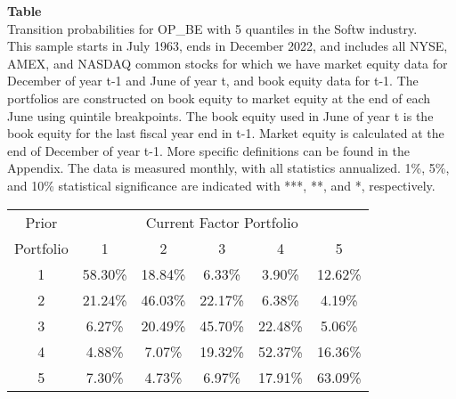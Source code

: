 \begin{table*}[ht!]
\raggedright
{}
\label{tab: transition_probs_OP_BE_Softw_with_5_quantiles}
\textbf{Table \thetable} \\
Transition probabilities for OP_BE with 5 quantiles in the Softw industry. \\
\hspace*{1em}This sample starts in July 1963, ends in December 2022, and includes all NYSE, AMEX, and NASDAQ common stocks for which we have market equity data for December of year t-1 and June of year t, and book equity data for t-1. The portfolios are constructed on book equity to market equity at the end of each June using quintile breakpoints.  The book equity used in June of year t is the book equity for the last fiscal year end in t-1.  Market equity is calculated at the end of December of year t-1.  More specific definitions can be found in the Appendix.  The data is measured monthly, with all statistics annualized.  1\%, 5\%, and 10\% statistical significance are indicated with ***, **, and *, respectively. \\
\vspace{0.5em}
\centering
\begin{adjustbox}{max width=\textwidth}
\begin{tabular}{@{}cccccc@{}}
\toprule
Prior & \multicolumn{5}{c}{Current Factor Portfolio} \\
Portfolio & 1 & 2 & 3 & 4 & 5 \\
\midrule
1 & 58.30\% & 18.84\% & 6.33\% & 3.90\% & 12.62\% \\
2 & 21.24\% & 46.03\% & 22.17\% & 6.38\% & 4.19\% \\
3 & 6.27\% & 20.49\% & 45.70\% & 22.48\% & 5.06\% \\
4 & 4.88\% & 7.07\% & 19.32\% & 52.37\% & 16.36\% \\
5 & 7.30\% & 4.73\% & 6.97\% & 17.91\% & 63.09\% \\
\bottomrule
\end{tabular}
\end{adjustbox}
\end{table*}